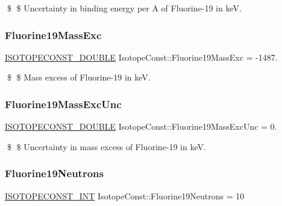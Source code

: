 \$ \$ Uncertainty in binding energy per A of Fluorine-\/19 in keV. \mbox{\label{group___isotope_const-_fluorine-_f19_gab4e8bc121c7c67aba386edb9f98feb75}} 
\subsubsection{\texorpdfstring{Fluorine19\+Mass\+Exc}{Fluorine19MassExc}}
{\footnotesize\ttfamily \mbox{\hyperlink{group___isotope_const-_macros_ga8f45a7272ce02c0b4c65c44636ed719a}{I\+S\+O\+T\+O\+P\+E\+C\+O\+N\+S\+T\+\_\+\+D\+O\+U\+B\+LE}} Isotope\+Const\+::\+Fluorine19\+Mass\+Exc = -\/1487.}

\$ \$ Mass excess of Fluorine-\/19 in keV. \mbox{\label{group___isotope_const-_fluorine-_f19_ga87aee3caf6c68efa2a9bcace61287253}} 
\subsubsection{\texorpdfstring{Fluorine19\+Mass\+Exc\+Unc}{Fluorine19MassExcUnc}}
{\footnotesize\ttfamily \mbox{\hyperlink{group___isotope_const-_macros_ga8f45a7272ce02c0b4c65c44636ed719a}{I\+S\+O\+T\+O\+P\+E\+C\+O\+N\+S\+T\+\_\+\+D\+O\+U\+B\+LE}} Isotope\+Const\+::\+Fluorine19\+Mass\+Exc\+Unc = 0.}

\$ \$ Uncertainty in mass excess of Fluorine-\/19 in keV. \mbox{\label{group___isotope_const-_fluorine-_f19_gaa9df6f9d82b4a2315e7f2015d54d222f}} 
\subsubsection{\texorpdfstring{Fluorine19\+Neutrons}{Fluorine19Neutrons}}
{\footnotesize\ttfamily \mbox{\hyperlink{group___isotope_const-_macros_ga5f18360b3e99483a35c32d789e62621c}{I\+S\+O\+T\+O\+P\+E\+C\+O\+N\+S\+T\+\_\+\+I\+NT}} Isotope\+Const\+::\+Fluorine19\+Neutrons = 10}


